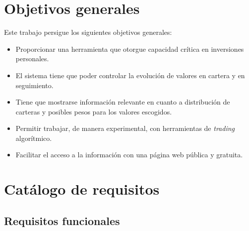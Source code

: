 \section{Objetivos generales}\label{objetivos-generales}

Este trabajo persigue los siguientes objetivos generales:

\begin{itemize}
\item
Proporcionar una herramienta que otorgue capacidad crítica en inversiones personales.
\item
El sistema tiene que poder controlar la evolución de valores en cartera y en seguimiento. 
\item
Tiene que mostrarse información relevante en cuanto a distribución de carteras y posibles pesos para los valores escogidos. 
\item
Permitir trabajar, de manera experimental, con herramientas de \emph{trading} algorítmico. 
\item
Facilitar el acceso a la información con una página web pública y gratuita. 
\end{itemize}


\section{Catálogo de requisitos}

\subsection{Requisitos funcionales}

